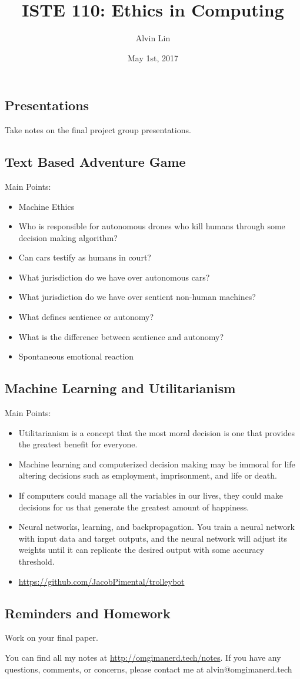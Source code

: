 \documentclass[letterpaper, 12pt]{article}
\title{ISTE 110: Ethics in Computing}
\author{Alvin Lin}
\date{May 1st, 2017}
\begin{document}
\maketitle

\subsection*{Presentations}
Take notes on the final project group presentations.

\subsection*{Text Based Adventure Game}
Main Points:
\begin{itemize}
  \item Machine Ethics
  \item Who is responsible for autonomous drones who kill humans through some
    decision making algorithm?
  \item Can cars testify as humans in court?
  \item What jurisdiction do we have over autonomous cars?
  \item What jurisdiction do we have over sentient non-human machines?
  \item What defines sentience or autonomy?
  \item What is the difference between sentience and autonomy?
  \item Spontaneous emotional reaction
\end{itemize}

\subsection*{Machine Learning and Utilitarianism}
Main Points:
\begin{itemize}
  \item Utilitarianism is a concept that the most moral decision is one that
    provides the greatest benefit for everyone.
  \item Machine learning and computerized decision making may be immoral for
    life altering decisions such as employment, imprisonment, and life or death.
  \item If computers could manage all the variables in our lives, they could
    make decisions for us that generate the greatest amount of happiness.
  \item Neural networks, learning, and backpropagation. You train a neural
    network with input data and target outputs, and the neural network will
    adjust its weights until it can replicate the desired output with some
    accuracy threshold.
  \item \url{https://github.com/JacobPimental/trolleybot}
\end{itemize}

\subsection*{Reminders and Homework}
Work on your final paper.

\begin{center}
  You can find all my notes at \url{http://omgimanerd.tech/notes}. If you have
  any questions, comments, or concerns, please contact me at
  alvin@omgimanerd.tech
\end{center}
\end{document}
